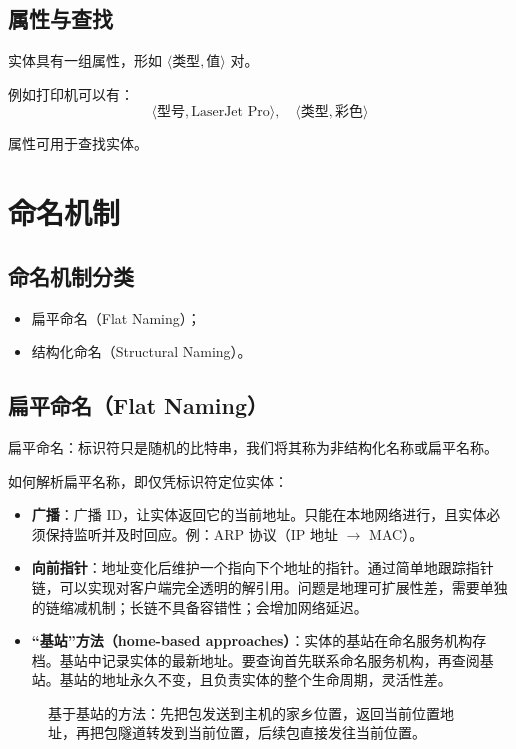 \subsection{属性与查找}

实体具有一组属性，形如 \(\langle\text{类型}, \text{值}\rangle\) 对。

例如打印机可以有：
\[
\langle\text{型号}, \text{LaserJet Pro}\rangle,\quad
\langle\text{类型}, \text{彩色}\rangle
\]

属性可用于查找实体。

\section{命名机制}

\subsection{命名机制分类}

\begin{itemize}
  \item 扁平命名（Flat Naming）；
  \item 结构化命名（Structural Naming）。
\end{itemize}

\subsection{扁平命名（Flat Naming）}

扁平命名：标识符只是随机的比特串，我们将其称为非结构化名称或扁平名称。

如何解析扁平名称，即仅凭标识符定位实体：
\begin{itemize}
  \item \textbf{广播}：广播 ID，让实体返回它的当前地址。只能在本地网络进行，且实体必须保持监听并及时回应。例：ARP 协议（IP 地址 \(\to\) MAC）。
  \item \textbf{向前指针}：地址变化后维护一个指向下个地址的指针。通过简单地跟踪指针链，可以实现对客户端完全透明的解引用。问题是地理可扩展性差，需要单独的链缩减机制；长链不具备容错性；会增加网络延迟。
  \item \textbf{“基站”方法（home-based approaches）}：实体的基站在命名服务机构存档。基站中记录实体的最新地址。要查询首先联系命名服务机构，再查阅基站。基站的地址永久不变，且负责实体的整个生命周期，灵活性差。
\end{itemize}

\begin{figure}[H]
  \centering
  \caption{基于基站的方法：先把包发送到主机的家乡位置，返回当前位置地址，再把包隧道转发到当前位置，后续包直接发往当前位置。}
\end{figure}

